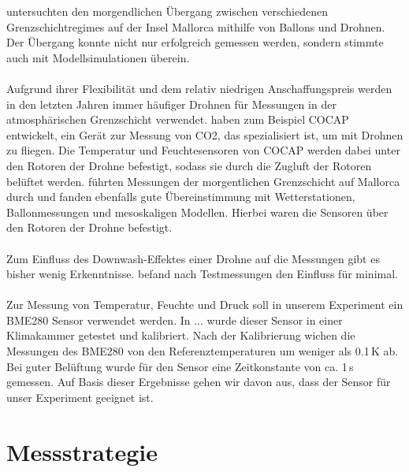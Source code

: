 \documentclass[a4paper,11pt,DIV=calc,tablecaptionabove,headinclude,twoside]{article}
\begin{document}
\citet{jimenez2016morning} untersuchten den morgendlichen Übergang zwischen verschiedenen Grenzschichtregimes auf der Insel Mallorca mithilfe von Ballons und Drohnen. Der Übergang konnte nicht nur erfolgreich gemessen werden, sondern stimmte auch mit Modellsimulationen überein.\\\\ 
Aufgrund ihrer Flexibilität und dem relativ niedrigen Anschaffungspreis werden
in den letzten Jahren immer häufiger Drohnen für Messungen in der atmosphärischen Grenzschicht verwendet. \citet{kunz2018cocap} haben zum Beispiel COCAP entwickelt, ein Gerät zur Messung von CO2, das spezialisiert ist, um mit Drohnen zu fliegen. Die Temperatur und Feuchtesensoren von COCAP werden dabei unter den Rotoren der Drohne befestigt, sodass sie durch die 
Zugluft der Rotoren belüftet werden. \citet{jimenez2016morning} führten Messungen der morgentlichen Grenzschicht auf Mallorca durch und fanden ebenfalls gute Übereinstimmung mit Wetterstationen, Ballonmessungen und mesoskaligen Modellen. Hierbei waren die Sensoren über den Rotoren
der Drohne befestigt.\\\\
Zum Einfluss des Downwash-Effektes einer Drohne auf die Messungen gibt es bisher wenig Erkenntnisse. \citet{zhou2017small} befand nach Testmessungen den Einfluss für minimal.\\\\
Zur Messung von Temperatur, Feuchte und Druck soll in unserem Experiment ein BME280 Sensor verwendet werden. In ... wurde dieser Sensor in einer Klimakammer getestet und kalibriert. Nach der Kalibrierung wichen die Messungen des BME280 von den Referenztemperaturen um weniger als 0.1\,K ab. Bei guter Belüftung wurde für den Sensor eine Zeitkonstante von ca. 1\,s gemessen. Auf Basis dieser Ergebnisse gehen wir davon aus, dass der Sensor für unser Experiment geeignet ist.  

\section{Messstrategie}
\end{document}
